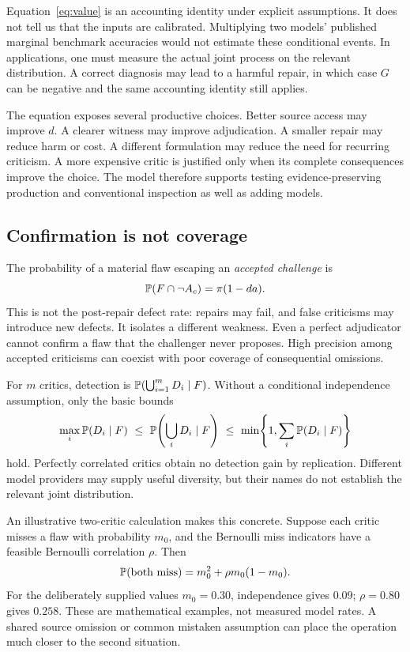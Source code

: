 Equation~\eqref{eq:value} is an accounting identity under explicit assumptions. It does not tell us that the inputs are calibrated. Multiplying two models' published marginal benchmark accuracies would not estimate these conditional events. In applications, one must measure the actual joint process on the relevant distribution. A correct diagnosis may lead to a harmful repair, in which case $G$ can be negative and the same accounting identity still applies.

The equation exposes several productive choices. Better source access may improve $d$. A clearer witness may improve adjudication. A smaller repair may reduce harm or cost. A different formulation may reduce the need for recurring criticism. A more expensive critic is justified only when its complete consequences improve the choice. The model therefore supports testing evidence-preserving production and conventional inspection as well as adding models.

\subsection{Confirmation is not coverage}
The probability of a material flaw escaping an \emph{accepted challenge} is
\begin{equation}
\mathbb{P}(F\cap\neg A_c)=\pi(1-da).
\label{eq:escape}
\end{equation}
This is not the post-repair defect rate: repairs may fail, and false criticisms may introduce new defects. It isolates a different weakness. Even a perfect adjudicator cannot confirm a flaw that the challenger never proposes. High precision among accepted criticisms can coexist with poor coverage of consequential omissions.

For $m$ critics, detection is $\mathbb{P}(\bigcup_{i=1}^{m}D_i\mid F)$. Without a conditional independence assumption, only the basic bounds
\begin{equation}
\max_i\Prob(D_i\mid F)\ \leq\ \Prob\!\left(\bigcup_iD_i\mid F\right)\ \leq\ \min\!\left\{1,\sum_i\Prob(D_i\mid F)\right\}
\end{equation}
hold. Perfectly correlated critics obtain no detection gain by replication. Different model providers may supply useful diversity, but their names do not establish the relevant joint distribution.

An illustrative two-critic calculation makes this concrete. Suppose each critic misses a flaw with probability $m_0$, and the Bernoulli miss indicators have a feasible Bernoulli correlation $\rho$. Then
\begin{equation}
\mathbb{P}(\text{both miss})=m_0^2+\rho m_0(1-m_0).
\label{eq:correlation}
\end{equation}
For the deliberately supplied values $m_0=0.30$, independence gives $0.09$; $\rho=0.80$ gives $0.258$. These are mathematical examples, not measured model rates. A shared source omission or common mistaken assumption can place the operation much closer to the second situation.

